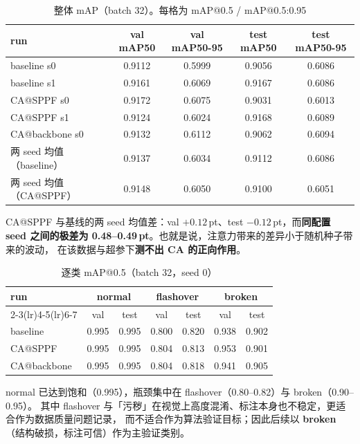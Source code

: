\documentclass[UTF8,a4paper,11pt]{ctexart}
\begin{document}
\begin{table}[htbp]
\centering
\caption{整体 mAP（batch 32）。每格为 mAP@0.5 / mAP@0.5:0.95}
\label{tab:overall}
\begin{tabular}{lcccc}
\toprule
run & val mAP50 & val mAP50-95 & test mAP50 & test mAP50-95 \\
\midrule
baseline s0      & 0.9112 & 0.5999 & 0.9056 & 0.6086 \\
baseline s1      & 0.9161 & 0.6069 & 0.9167 & 0.6086 \\
CA@SPPF s0       & 0.9172 & 0.6075 & 0.9031 & 0.6013 \\
CA@SPPF s1       & 0.9124 & 0.6024 & 0.9168 & 0.6089 \\
CA@backbone s0   & 0.9132 & 0.6112 & 0.9062 & 0.6094 \\
\midrule
两 seed 均值（baseline） & 0.9137 & 0.6034 & 0.9112 & 0.6086 \\
两 seed 均值（CA@SPPF）  & 0.9148 & 0.6050 & 0.9100 & 0.6051 \\
\bottomrule
\end{tabular}
\end{table}

CA@SPPF 与基线的两 seed 均值差：val $+0.12$\,pt、test $-0.12$\,pt，而\textbf{同配置
seed 之间的极差为 0.48--0.49\,pt}。也就是说，注意力带来的差异小于随机种子带来的波动，
在该数据与超参下\textbf{测不出 CA 的正向作用}。

\begin{table}[htbp]
\centering
\caption{逐类 mAP@0.5（batch 32，seed 0）}
\begin{tabular}{lcccccc}
\toprule
run & \multicolumn{2}{c}{normal} & \multicolumn{2}{c}{flashover} & \multicolumn{2}{c}{broken} \\
\cmidrule(lr){2-3}\cmidrule(lr){4-5}\cmidrule(lr){6-7}
 & val & test & val & test & val & test \\
\midrule
baseline        & 0.995 & 0.995 & 0.800 & 0.820 & 0.938 & 0.902 \\
CA@SPPF         & 0.995 & 0.995 & 0.804 & 0.813 & 0.953 & 0.901 \\
CA@backbone     & 0.995 & 0.995 & 0.804 & 0.818 & 0.941 & 0.905 \\
\bottomrule
\end{tabular}
\end{table}

normal 已达到饱和（0.995），瓶颈集中在 flashover（0.80--0.82）与 broken（0.90--0.95）。
其中 flashover 与「污秽」在视觉上高度混淆、标注本身也不稳定，更适合作为数据质量问题记录，
而不适合作为算法验证目标；因此后续以 \textbf{broken}（结构破损，标注可信）作为主验证类别。
\end{document}
